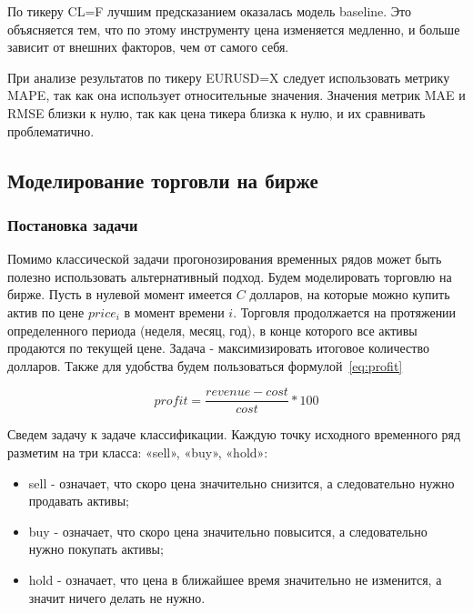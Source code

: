 \documentclass[a4paper,article,14pt]{extarticle}
\begin{document}
По тикеру CL=F лучшим предсказанием оказалась модель baseline.
Это объясняется тем, что по этому инструменту цена изменяется медленно, и больше зависит от внешних факторов, чем от самого себя.

При анализе результатов по тикеру EURUSD=X следует использовать метрику MAPE, так как она использует относительные значения.
Значения метрик MAE и RMSE близки к нулю, так как цена тикера близка к нулю, и их сравнивать проблематично.


\pagebreak



\subsection{Моделирование торговли на бирже}
\subsubsection{Постановка задачи}

Помимо классической задачи прогонозирования временных рядов может быть полезно использовать альтернативный подход.
Будем моделировать торговлю на бирже.
Пусть в нулевой момент имеется $C$ долларов, на которые можно купить актив по цене $price_i$ в момент времени $i$.
Торговля продолжается на протяжении определенного периода (неделя, месяц, год), в конце которого все активы продаются по текущей цене.
Задача - максимизировать итоговое количество долларов.
Также для удобства будем пользоваться формулой~\eqref{eq:profit}

\begin{equation}
    profit = \frac{revenue - cost}{cost} * 100
    \label{eq:profit}
\end{equation}

Сведем задачу к задаче классификации.
Каждую точку исходного временного ряд разметим на три класса: «sell», «buy», «hold»:

\begin{itemize}
    \item sell - означает, что скоро цена значительно снизится, а следовательно нужно продавать активы;
    \item buy - означает, что скоро цена значительно повысится, а следовательно нужно покупать активы;
    \item hold - означает, что цена в ближайшее время значительно не изменится, а значит ничего делать не нужно.
\end{itemize}
\end{document}
